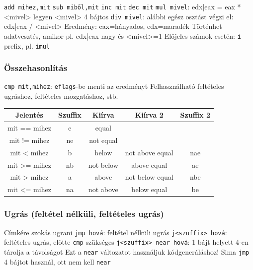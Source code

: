 \documentclass[12pt,a4paper]{article}
\begin{document}
\begin{outline}
	\1 \texttt{add mihez,mit}
	\1 \texttt{sub miből,mit}
	\1 \texttt{inc mit}
	\1 \texttt{dec mit}
	\1 \texttt{mul mivel}: edx|eax = eax * <mivel>
		\2 legyen <mivel> 4 bájtos
	\1 \texttt{div mivel}: alábbi egész osztást végzi el: edx|eax / <mivel>
		\2 Eredmény: eax=hányados, edx=maradék
		\2 Történhet adatvesztés, amikor pl. edx|eax nagy és <mivel>=1
	\1 Előjeles számok esetén: \texttt{i} prefix, pl. \texttt{imul}
\end{outline}

\pagebreak

\subsubsection{Összehasonlítás}

\begin{outline}
	\1 \texttt{cmp mit,mihez}: \texttt{eflags}-be menti az eredményt
	\1 Felhasználható feltételes ugráshoz, feltételes mozgatáshoz, stb.
\end{outline}

\begin{table}[h]
	\centering
	\begin{tabular}{|c|c|c|c|c|}
		\hline
		Jelentés & Szuffix & Kiírva & Kiírva 2 & Szuffix 2 \\
		\hline
		mit == mihez & e & equal & & \\
		\hline
		mit != mihez & ne & not equal & & \\
		\hline
		mit < mihez & b & below & not above equal & nae \\
		\hline
		mit >= mihez & nb & not below & above equal & ae \\
		\hline
		mit > mihez & a & above & not below equal & nbe \\
		\hline
		mit <= mihez & na & not above & below equal & be \\
		\hline
	\end{tabular}
\end{table}

\subsubsection{Ugrás (feltétel nélküli, feltételes ugrás)}

\begin{outline}
	\1 Címkére szokás ugrani
	\1 \texttt{jmp hová}: feltétel nélküli ugrás
	\1 \texttt{j<szuffix> hová}: feltételes ugrás, előtte \texttt{cmp} szükséges
		\2 \texttt{j<szuffix> near hová}: 1 bájt helyett 4-en tárolja a távolságot
		\2 Ezt a \texttt{near} változatot használjuk kódgeneráláshoz!
		\2 Sima \texttt{jmp} 4 bájtot használ, ott nem kell \texttt{near}
\end{outline}
\end{document}
